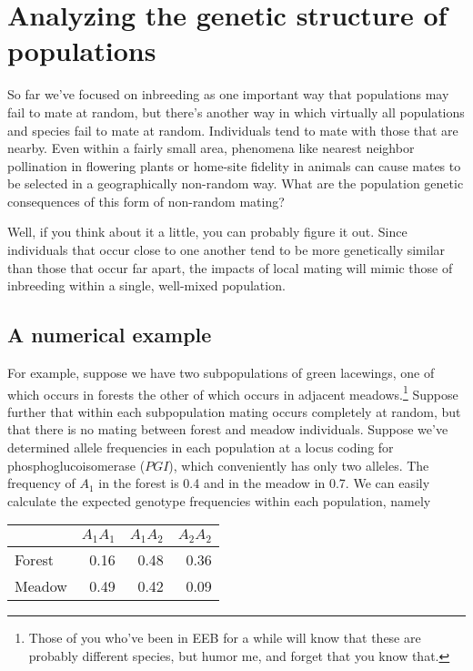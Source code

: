 \chapter{Analyzing the genetic structure of populations}

So far we've focused on inbreeding as one important way that
populations may fail to mate at random, but there's another way in
which virtually all populations and species fail to mate at
random. Individuals tend to mate with those that are nearby. Even
within a fairly small area, phenomena like nearest neighbor
pollination in flowering plants or home-site fidelity in animals can
cause mates to be selected in a geographically non-random way. What
are the population genetic consequences of this form of non-random
mating?

Well, if you think about it a little, you can probably figure it
out. Since individuals that occur close to one another tend to be more
genetically similar than those that occur far apart, the impacts of
local mating will mimic those of inbreeding within a single,
well-mixed population.

\section*{A numerical example}

For example, suppose we have two subpopulations of green lacewings,
one of which occurs in forests the other of which occurs in adjacent
meadows.\footnote{Those of you who've been in EEB for a while will
  know that these are probably different species, but humor me, and
  forget that you know that.} Suppose further that within each
subpopulation mating occurs completely at random, but that there is no
mating between forest and meadow individuals. Suppose we've determined
allele frequencies in each population at a locus coding for
phosphoglucoisomerase ($PGI$), which conveniently has only two
alleles. The frequency of $A_1$ in the forest is 0.4 and in the meadow
in 0.7. We can easily calculate the expected genotype frequencies
within each population, namely

\begin{center}
\begin{tabular}{l|rrr}
\hline\hline
       & $A_1A_1$ & $A_1A_2$ & $A_2A_2$ \\
\hline
Forest &     0.16 &     0.48 &     0.36 \\
Meadow &     0.49 &     0.42 &     0.09 \\
\hline
\end{tabular}
\end{center}

